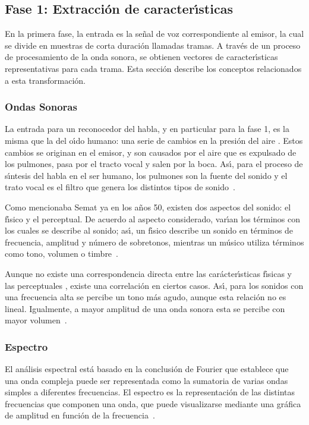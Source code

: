 \subsection{Fase 1: Extracci\'on de caracter{\'\i}sticas}
\label{sec:featureExtraction}

En la primera fase, la entrada es la se\~nal de voz correspondiente al emisor, la cual se divide en muestras de corta
duraci\'on llamadas tramas. A trav\'es de un proceso de procesamiento de la onda sonora, se obtienen vectores de 
caracter{\'\i}sticas representativas para cada trama. Esta secci\'on describe los conceptos relacionados a esta 
transformaci\'on.

\subsubsection{Ondas Sonoras}

La entrada para un reconocedor del habla, y en particular para la fase 1, es la misma que la del o{\'\i}do humano: una 
serie de cambios en la presi\'on del aire \cite{YoungUniversity2007}. Estos cambios se originan en el emisor, y son 
causados por el aire que es expulsado de los pulmones, pasa por el tracto vocal y salen por la boca. As{\'\i}, para el 
proceso de s{\'\i}ntesis del habla en el ser humano, los pulmones son la fuente
del sonido y el trato vocal es el filtro que genera los distintos tipos de \mbox{sonido \cite{BradburyLineal2000}}.

Como mencionaba Semat ya en los a\~nos 50, existen dos aspectos del sonido: el f{\'\i}sico y el perceptual. De acuerdo al 
aspecto considerado, var{\'\i}an los t\'erminos con los cuales se describe al sonido; as{\'\i}, un f{\'\i}sico describe un 
sonido en t\'erminos de frecuencia, amplitud y n\'umero de sobretonos, mientras un m\'usico utiliza t\'erminos como tono, 
volumen o \mbox{timbre \cite{SematPhysics1958}}.

Aunque no existe una correspondencia directa entre las car\'acter{\'\i}sticas f{\'\i}sicas y las perceptuales 
\cite{SematPhysics1958}, existe una correlaci\'on en ciertos casos. As{\'\i}, para los sonidos con una frecuencia alta se 
percibe un tono m\'as agudo, aunque esta relaci\'on no es lineal. Igualmente, a mayor amplitud de una onda sonora esta se 
percibe con mayor \mbox{volumen \cite{YoungUniversity2007}}.

\subsubsection{Espectro}
El an\'alisis espectral est\'a basado en la conclusi\'on de Fourier que establece que una onda compleja puede ser 
representada como la sumatoria de varias ondas simples a diferentes frecuencias. El espectro es la representaci\'on de las 
distintas frecuencias que componen una onda, que puede visualizarse mediante una gr\'afica de amplitud en funci\'on de la 
\mbox{frecuencia \cite{Jurafsky}}. 

